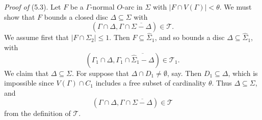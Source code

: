 \textit{Proof of} (5.3). Let $F$ be a $\Gamma$-normal $O$-arc in $\Sigma$ with $|F \cap V(\Gamma)| < \theta$. We must show that $F$ bounds a closed disc $\Delta \subseteq \Sigma$ with
\begin{equation*}
(\Gamma \cap \Delta, \Gamma \cap \overline{\Sigma - \Delta}) \in \mathscr{T}.
\end{equation*}
We assume first that $|F \cap \Sigma_2| \le 1$. Then $F \subseteq \hat{\Sigma}_1$, and so bounds a disc $\Delta \subseteq \hat{\Sigma}_1$, with
\begin{equation*}
(\Gamma_1 \cap \Delta, \Gamma_1 \cap \overline{\hat{\Sigma}_1 - \Delta}) \in \mathscr{T}_1.
\end{equation*}
We claim that $\Delta \subseteq \Sigma$. For suppose that $\Delta \cap D_1 \ne \emptyset$, say. Then $D_1 \subseteq \Delta$, which is impossible since $V(\Gamma) \cap C_1$ includes a free subset of cardinality $\theta$. Thus $\Delta \subseteq \Sigma$, and
\begin{equation*}
(\Gamma \cap \Delta, \Gamma \cap \overline{\Sigma - \Delta}) \in \mathscr{T}
\end{equation*}
from the definition of $\mathscr{T}$.

